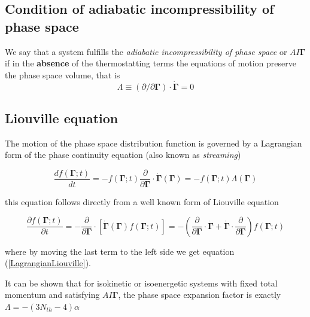 \documentclass[a4paper,12pt,nofootinbib]{article}
\begin{document}


\subsection{Condition of adiabatic incompressibility of phase space}

We say that a system fulfills the \textit{adiabatic incompressibility of phase space} or $AI\bm{\Gamma}$ if in the \textbf{absence} of the thermostatting terms the equations of motion preserve the phase space volume, that is
\begin{equation}
  \Lambda \equiv (\partial / \partial\bm{\Gamma}) \cdot \dot{\bm{\Gamma}}=0
\end{equation}


\subsection{Liouville equation}

The motion of the phase space distribution function is governed by a Lagrangian form of the phase continuity equation (also known as \textit{streaming})

\begin{equation}
\label{LagrangianLiouville}
  \frac{df(\bm{\Gamma};t)}{dt}=-f(\bm{\Gamma};t)\frac{\partial}{\partial \bm{\Gamma}} \cdot \dot{\bm{\Gamma}}(\bm{\Gamma}) = -f(\bm{\Gamma};t)\Lambda(\bm{\Gamma})
\end{equation}

this equation follows directly from a well known form of Liouville equation

\begin{equation}
    \frac{\partial f(\bm{\Gamma};t) }{\partial t}
    = -\frac{\partial}{\partial \bm{\Gamma}} \cdot [\dot{\bm{\Gamma}}(\bm{\Gamma}) f(\bm{\Gamma};t)]
     = -(\frac{\partial}{\partial \bm{\Gamma}} \cdot \dot{\bm{\Gamma}} + \dot{\bm{\Gamma}} \cdot \frac{\partial}{\partial \bm{\Gamma}}) f(\bm{\Gamma};t)
\end{equation}

where by moving the last term to the left side we get equation (\ref{LagrangianLiouville}).


It can be shown that for isokinetic or isoenergetic systems with fixed total momentum and satisfying $AI\bm{\Gamma}$, the phase space expansion factor is exactly $\Lambda = - (3N_{th} -4) \alpha $ 
\end{document}

